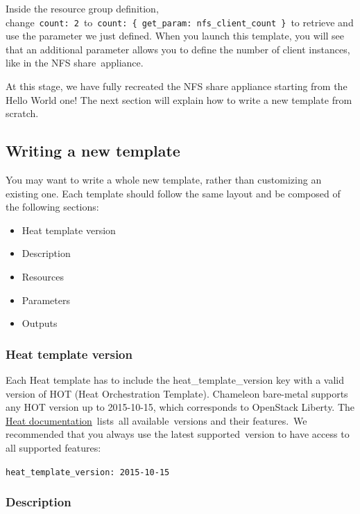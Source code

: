 Inside the resource group definition,
change~\texttt{count:\ 2}~to~\texttt{count:\ \{\ get\_param:\ nfs\_client\_count\ \}}~to
retrieve and use the parameter we just defined. When you launch this
template, you will see that an additional parameter allows you to define
the number of client instances, like in the NFS share~appliance.

At this stage, we have fully recreated the NFS share appliance starting
from the Hello World one! The next section will explain how to write a
new template from scratch.

\subsection{Writing a new template}\label{writing-a-new-template}

You may want to write a whole new template, rather than customizing an
existing one. Each template should follow the same layout and be
composed of the following sections:

\begin{itemize}
\item
  Heat template version
\item
  Description
\item
  Resources
\item
  Parameters
\item
  Outputs
\end{itemize}

\subsubsection{Heat template version}\label{heat-template-version}

Each Heat template has to include the heat\_template\_version key with a
valid version of HOT (Heat Orchestration Template). Chameleon bare-metal
supports any HOT version up to 2015-10-15, which corresponds to
OpenStack Liberty. The
\href{http://docs.openstack.org/developer/heat/template_guide/hot_spec.html\#hot-spec-template-version}{Heat
documentation}~lists~all available~versions and their features.~We
recommended that you always use the latest supported~version to have
access to all supported features:

\texttt{heat\_template\_version:\ 2015-10-15}

\subsubsection{Description}\label{description}

